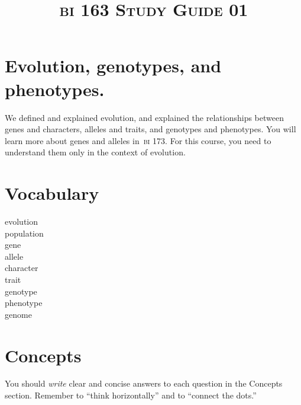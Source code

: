 \documentclass[letterpaper]{tufte-handout}
\title{\scshape{bi} 163 Study Guide 01}
\date{} %
\begin{document}
\maketitle	%

\section*{Evolution, genotypes, and phenotypes.}

We defined and explained evolution, and explained the relationships between genes and characters, alleles and traits, and genotypes and phenotypes. You will learn more about genes and alleles in~{\scshape bi} 173. For this course, you need to understand them only in the context of evolution.

\section*{Vocabulary}

\vspace{-1\baselineskip}
\begin{multicols}{2}
evolution\\
population \\
gene \\
allele \\
character \\
trait \\
genotype \\
phenotype \\
genome
\end{multicols}

\section*{Concepts}

You should \emph{write} clear and concise answers to each question in the Concepts section.  Remember to ``think horizontally'' and to ``connect the dots.'' 
\end{document}
